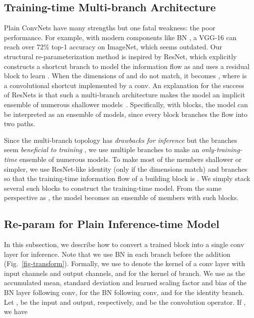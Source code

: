 \documentclass[final]{cvpr}
\begin{document}
\subsection{Training-time Multi-branch Architecture}

Plain ConvNets have many strengths but one fatal weakness: the poor performance. For example, with modern components like BN \cite{ioffe2015batch}, a VGG-16 can reach over 72\% top-1 accuracy on ImageNet, which seems outdated. Our structural re-parameterization method is inspired by ResNet, which explicitly constructs a shortcut branch to model the information flow as  and uses a residual block to learn . When the dimensions of  and  do not match, it becomes , where  is a convolutional shortcut implemented by a  conv. An explanation for the success of ResNets is that such a multi-branch architecture makes the model an implicit ensemble of numerous shallower models~\cite{veit2016residual}. Specifically, with  blocks, the model can be interpreted as an ensemble of  models, since every block branches the flow into two paths.

Since the multi-branch topology has \textit{drawbacks for inference} but the branches seem \textit{beneficial to training} \cite{veit2016residual}, we use multiple branches to make an \textit{only-training-time} ensemble of numerous models. To make most of the members shallower or simpler, we use ResNet-like identity (only if the dimensions match) and  branches so that the training-time information flow of a building block is . We simply stack several such blocks to construct the training-time model. From the same perspective as \cite{veit2016residual}, the model becomes an ensemble of  members with  such blocks. 


\subsection{Re-param for Plain Inference-time Model}

In this subsection, we describe how to convert a trained block into a single  conv layer for inference. Note that we use BN in each branch before the addition (Fig.~\ref{fig-transform}). Formally, we use  to denote the kernel of a  conv layer with  input channels and  output channels, and  for the kernel of  branch. We use  as the accumulated mean, standard deviation and learned scaling factor and bias of the BN layer following  conv,  for the BN following  conv, and  for the identity branch. Let ,  be the input and output, respectively, and  be the convolution operator. If , we have
\end{document}
